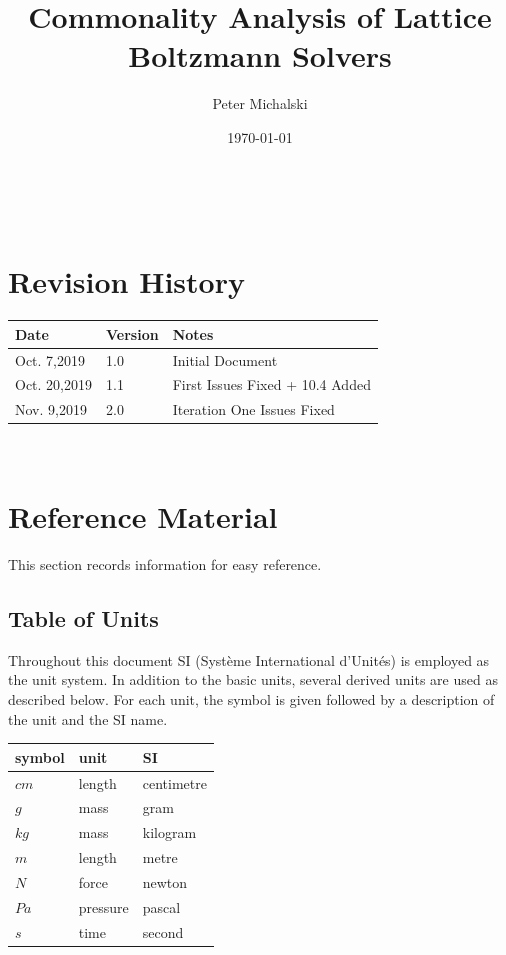 \documentclass[12pt]{article}
\newcommand{\famname}{Lattice Boltzmann Solvers} %
\begin{document}
\title{Commonality Analysis of {\famname}} 
\author{Peter Michalski}
\date{\today}

\maketitle

~\newpage


\section{Revision History} \label{CAREVHISTORY}

\begin{tabularx}{\textwidth}{p{3cm}p{2cm}X}
\toprule {\bf Date} & {\bf Version} & {\bf Notes}\\
\midrule
Oct. 7,2019 & 1.0 & Initial Document\\
Oct. 20,2019 & 1.1 & First Issues Fixed + 10.4 Added\\
Nov. 9,2019 & 2.0 & Iteration One Issues Fixed\\
\bottomrule
\end{tabularx}

~\newpage
	
\section{Reference Material}

This section records information for easy reference.

\subsection{Table of Units}

Throughout this document SI (Syst\`{e}me International d'Unit\'{e}s) is employed
as the unit system.  In addition to the basic units, several derived units are
used as described below.  For each unit, the symbol is given followed by a
description of the unit and the SI name.
~\newline

\renewcommand{\arraystretch}{1.2}
  \noindent \begin{tabular}{l l l} 
    \toprule		
    \textbf{symbol} & \textbf{unit} & \textbf{SI}\\
    \midrule 
    $cm$ & length & centimetre\\
    $g$ & mass & gram \\
    $kg$ & mass	& kilogram\\
    $m$ & length & metre\\
    $N$ & force & newton\\
    $Pa$ & pressure & pascal\\
    $s$ & time & second\\
    \bottomrule
  \end{tabular}
\end{document}
